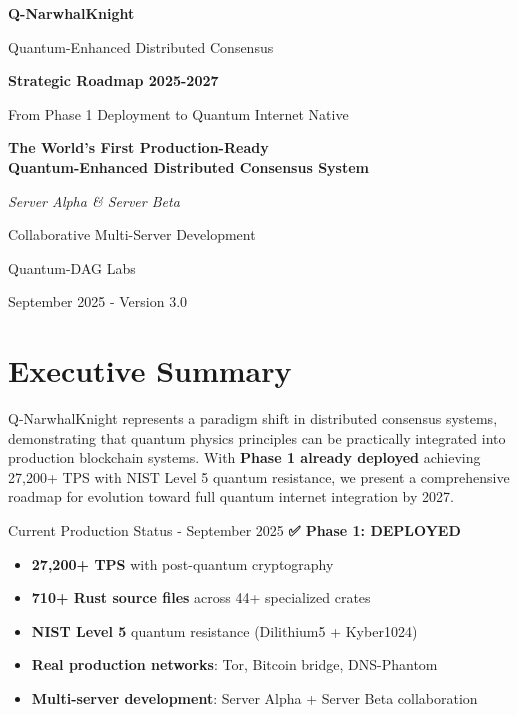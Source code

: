 \documentclass[11pt,a4paper]{article}
\begin{document}
\begin{titlepage}
\centering
{\Huge\textbf{\textcolor{quantumblue}{Q-NarwhalKnight}}\par}
\vspace{0.5cm}
{\Large\textcolor{quantumgreen}{Quantum-Enhanced Distributed Consensus}\par}
\vspace{1cm}
{\huge\textbf{Strategic Roadmap 2025-2027}\par}
\vspace{0.5cm}
{\Large From Phase 1 Deployment to Quantum Internet Native\par}
\vspace{2cm}

\begin{tcolorbox}[colback=quantumblue!5!white,colframe=quantumblue!75!black]
\centering
\textbf{The World's First Production-Ready\\Quantum-Enhanced Distributed Consensus System}
\end{tcolorbox}

\vspace{2cm}
{\Large\textit{Server Alpha \& Server Beta}\par}
{\large Collaborative Multi-Server Development\par}
\vspace{1cm}
{\large Quantum-DAG Labs\par}
{\normalsize September 2025 - Version 3.0\par}
\end{titlepage}

\newpage
\tableofcontents
\newpage

\section{Executive Summary}

Q-NarwhalKnight represents a paradigm shift in distributed consensus systems, demonstrating that quantum physics principles can be practically integrated into production blockchain systems. With \textbf{Phase 1 already deployed} achieving 27,200+ TPS with NIST Level 5 quantum resistance, we present a comprehensive roadmap for evolution toward full quantum internet integration by 2027.

\begin{achievementbox}{Current Production Status - September 2025}
\textbf{✅ Phase 1: DEPLOYED}
\begin{itemize}
\item \textbf{27,200+ TPS} with post-quantum cryptography 
\item \textbf{710+ Rust source files} across 44+ specialized crates
\item \textbf{NIST Level 5} quantum resistance (Dilithium5 + Kyber1024)
\item \textbf{Real production networks}: Tor, Bitcoin bridge, DNS-Phantom
\item \textbf{Multi-server development}: Server Alpha + Server Beta collaboration
\end{itemize}
\end{achievementbox}
\end{document}

